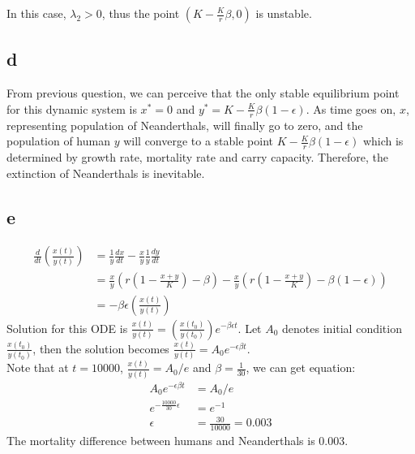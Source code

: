 \documentclass[11pt,letterpaper]{article}
\begin{document}
\noindent In this case, $\lambda_2 > 0$, thus the point $(K - \frac{K}{r} \beta, 0)$ is unstable. \\

\subsection*{d}
\noindent From previous question, we can perceive that the only stable equilibrium point for this dynamic system is $x^* = 0$ and $y^* =K - \frac{K}{r} \beta (1 - \epsilon) $. As time goes on, $x$, representing population of Neanderthals, will finally go to zero, and the population of human $y$ will converge to a stable point $K - \frac{K}{r} \beta (1 - \epsilon) $ which is determined by growth rate, mortality rate and carry capacity. Therefore, the extinction of Neanderthals is inevitable. \\

\subsection*{e}
\begin{align*}
\frac{d}{dt} ( \frac{x(t)}{y(t)} )&= \frac{1}{y} \frac{dx}{dt} - \frac{x}{y} \frac{1}{y} \frac{dy}{dt} \\
&= \frac{x}{y} (r(1 - \frac{x+y}{K}) - \beta) - \frac{x}{y} (r(1 - \frac{x + y}{K}) - \beta (1 - \epsilon)) \\
&= - \beta \epsilon ( \frac{x(t)}{y (t)} )
\end{align*}
\noindent Solution for this ODE is $\frac{x(t)}{y(t)} = (\frac{x(t_0)}{y(t_0)}) e ^{- \beta \epsilon t}$. Let $A_0$ denotes initial condition $\frac{x(t_0)}{y(t_0)}$, then the solution becomes $\frac{x(t)}{y(t)} = A_0 e^{-\epsilon \beta t}$. \\

\noindent Note that at $t = 10000$, $\frac{x(t)}{y(t)} = A_0 / e$ and $\beta = \frac{1}{30}$, we can get equation:
\begin{align*}
A_0 e^{- \epsilon \beta t} &= A_0 / e \\
e^{- \frac{10000}{30} \epsilon} &= e^{-1} \\
\epsilon &= \frac{30 }{10000} = 0.003
\end{align*}
\noindent The mortality difference between humans and Neanderthals is 0.003.
\end{document}

